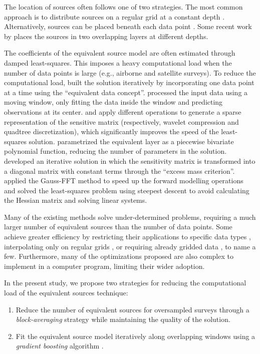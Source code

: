 The location of sources often follows one of two strategies.
The most common approach is to distribute sources on a regular grid at a
constant depth \citep[e.g.,~][]{leao1989, barnes2011, oliveira2013}.
Alternatively, sources can be placed beneath each data point
\citep[e.g.,~][]{cordell1992, siqueira2017}.
Some recent work by \citet{li2020} places the sources in two overlapping layers
at different depths.

The coefficients of the equivalent source model are often estimated through
damped least-squares.
This imposes a heavy computational load when the number of data points is
large (e.g., airborne and satellite surveys).
To reduce the computational load, \citet{mendonca1994} built the solution
iteratively by incorporating one data point at a time using the ``equivalent
data concept''.
\citet{leao1989} processed the input data using a moving window, only fitting the
data inside the window and predicting observations at its center.
\citet{li2010} and \citet{barnes2011} apply different operations to generate a
sparse representation of the sensitive matrix (respectively, wavelet
compression and quadtree discretization), which significantly improves the
speed of the least-squares solution.
\citet{oliveira2013} parametrized the equivalent layer as a piecewise bivariate
polynomial function, reducing the number of parameters in the solution.
\citet{siqueira2017} developed an iterative solution in which the sensitivity
matrix is transformed into a diagonal matrix with constant terms through the
``excess mass criterion''.
\citet{jirigalatu2019} applied the Gauss-FFT method to speed up the forward
modelling operations and solved the least-squares problem using steepest
descent to avoid calculating the Hessian matrix and solving linear systems.

Many of the existing methods solve under-determined problems, requiring a much
larger number of equivalent sources than the number of data points.
Some achieve greater efficiency by restricting their applications
to specific data types \citep{siqueira2017},
interpolating only on regular grids \citep{leao1989},
or requiring already gridded data \citep{takahashi2020},
to name a few.
Furthermore, many of the optimizations proposed are also complex to implement
in a computer program, limiting their wider adoption.

In the present study,
we propose two strategies for reducing the computational load of
the equivalent sources technique:

\begin{enumerate}
    \item Reduce the number of equivalent sources for oversampled surveys
      through a \emph{block-averaging} strategy while maintaining the quality
      of the solution.
    \item Fit the equivalent source model iteratively along overlapping windows
      using a \emph{gradient boosting} algorithm \citep{friedman2001}.
\end{enumerate}

